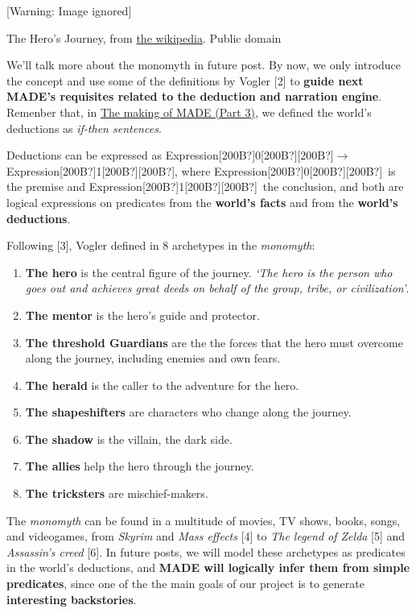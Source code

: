 \documentclass[a4paper]{article}
\newcommand\textstyleStrongEmphasis[1]{\textbf{#1}}
\newcommand\textstyleEmphasis[1]{\textit{#1}}
\newcommand\liststyleLvii{%
\renewcommand\theenumi{\arabic{enumi}}
\renewcommand\theenumii{\arabic{enumii}}
\renewcommand\theenumiii{\arabic{enumiii}}
\renewcommand\theenumiv{\arabic{enumiv}}
\renewcommand\labelenumi{\theenumi.}
\renewcommand\labelenumii{\theenumii.}
\renewcommand\labelenumiii{\theenumiii.}
\renewcommand\labelenumiv{\theenumiv.}
}
\begin{document}
  [Warning: Image ignored] %
 

The Hero{\textquoteright}s Journey, from
\href{https://en.wikipedia.org/wiki/File:Heroesjourney.svg}{the
wikipedia}. Public domain

We{\textquoteright}ll talk more about the monomyth in future post. By
now, we only introduce the concept and use some of the definitions by
Vogler [2] to \textstyleStrongEmphasis{guide next
MADE{\textquoteright}s requisites related to the deduction and
narration engine}. Remenber that, in
\href{http://www.velonuboso.com/made/2015/06/14/making-part-3-worlds-facts-worlds-deductions-worlds-backstories/}{The
making of MADE (Part 3)}, we defined the world{\textquoteright}s
deductions as \textstyleEmphasis{if-then sentences}.

Deductions can be expressed as
Expression[200B?]0[200B?][200B?]$\rightarrow
$Expression[200B?]1[200B?][200B?], where
Expression[200B?]0[200B?][200B?]~is the premise and
Expression[200B?]1[200B?][200B?]~the conclusion, and both are logical
expressions on predicates from the
\textstyleStrongEmphasis{world{\textquoteright}s facts} and from the
\textstyleStrongEmphasis{world{\textquoteright}s deductions}.

Following [3], Vogler defined in 8 archetypes in the
\textstyleEmphasis{monomyth}:

\liststyleLvii
\begin{enumerate}
\item \textstyleStrongEmphasis{The hero} is the central figure of the
journey. \textstyleEmphasis{{\textquoteleft}The hero is the person who
goes out and achieves great deeds on behalf of the group, tribe, or
civilization{\textquoteright}}. 
\item \textbf{The mentor} is the hero{\textquoteright}s guide and
protector. 
\item \textbf{The threshold Guardians} are the the forces that the hero
must overcome along the journey, including enemies and own fears. 
\item \textbf{The herald} is the caller to the adventure for the hero. 
\item \textbf{The shapeshifters} are characters who change along the
journey. 
\item \textbf{The shadow }is the villain, the dark side. 
\item \textbf{The allies} help the hero through the journey. 
\item \textbf{The tricksters} are mischief-makers. 
\end{enumerate}
The \textstyleEmphasis{monomyth} can be found in a multitude of movies,
TV shows, books, songs, and videogames, from \textstyleEmphasis{Skyrim}
and \textstyleEmphasis{Mass effects} [4] to \textstyleEmphasis{The
legend of Zelda} [5] and \textstyleEmphasis{Assassin{\textquoteright}s
creed }[6]. In future posts, we will model these archetypes as
predicates in the world{\textquoteright}s deductions, and
\textstyleStrongEmphasis{MADE will logically infer them from simple
predicates}, since one of the the main goals of our project is to
generate \textstyleStrongEmphasis{interesting backstories}.
\end{document}
